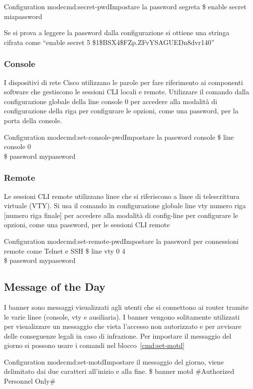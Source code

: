 \begin{cmds}{Configuration mode}{cmd:secret-pwd}{Impostare la password segreta}
    \$ enable secret \textcolor{Highlight1}{miapassword}
\end{cmds}

Se si prova a leggere la password dalla configurazione si ottiene una stringa cifrata come ``enable secret 5 \$1\$BSX4\$FZp.ZFvYSAGUEDn8dvr140''

\subsubsection{Console}
I dispositivi di rete Cisco utilizzano le parole per fare riferimento ai componenti software che gestiscono le sessioni CLI locali e remote. Utilizzare il comando dalla configurazione globale della line console 0 per accedere alla modalità di configurazione della riga per configurare le opzioni, come una password, per la porta della console.

\begin{cmds}{Configuration mode}{cmd:set-console-pwd}{Impostare la password console}
    \$ line console 0\\
    \$ password \textcolor{Highlight1}{mypassword}
\end{cmds}

\subsubsection{Remote}
Le sessioni CLI remote utilizzano linee che si riferiscono a linee di telescrittura virtuale (VTY). Si usa il comando in configurazione globale line vty numero riga [numero riga finale] per accedere alla modalità di config-line per configurare le opzioni, come una password, per le sessioni CLI remote

\begin{cmds}{Configuration mode}{cmd:set-remote-pwd}{Impostare la password per connessioni remote come Telnet e SSH}
    \$ line vty 0 4\\
    \$ password \textcolor{Highlight1}{mypassword}
\end{cmds}

\subsection{Message of the Day}
I banner sono messaggi visualizzati agli utenti che si connettono ai router tramite le varie linee (console, vty e ausiliaria). I banner vengono solitamente utilizzati per visualizzare un messaggio che vieta l’accesso non autorizzato e per avvisare delle conseguenze legali in caso di infrazione. Per impostare il messaggio del giorno si possono usare i comandi nel blocco~\ref{cmd:set-motd}

\begin{cmds}{Configuration mode}{cmd:set-motd}{Impostare il \textcolor{Highlight3}{messaggio del giorno}, viene delimitato dai due \textcolor{Highlight2}{caratteri} all'inizio e alla fine.}
    \$ banner motd \textcolor{Highlight2}{\#}\textcolor{Highlight3}{Authorized Personnel Only}\textcolor{Highlight2}{\#}
\end{cmds}
